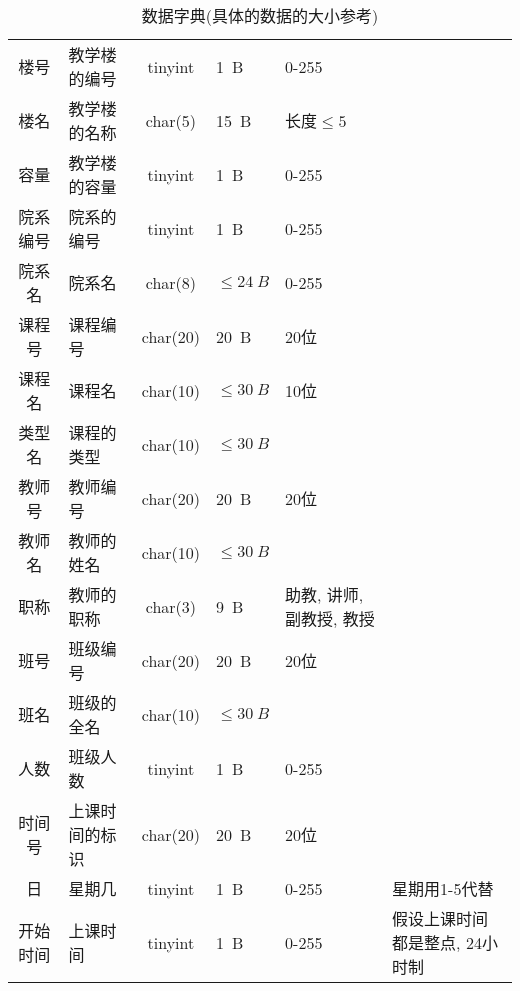 \documentclass{myreport}
\begin{document}
      \begin{longtabu} to \textwidth {clcXXX}
        \caption{数据字典(具体的数据的大小参考\cite{tinyint})}
        \label{t:data_dict} \\
        \toprule[1.5pt]
            &
           &
           &
           &
           &
           \\
        \midrule[1pt]
        \endhead

        \bottomrule[1.5pt]
        \endfoot


          楼号    & 教学楼的编号 & tinyint & \SI{1}{B} & 0-255 & \\
          楼名    & 教学楼的名称 & char(5) & \SI{15}{B} & 长度$\le 5$ & \\
          容量    & 教学楼的容量 & tinyint & \SI{1}{B} & 0-255 & \\
          院系编号 & 院系的编号 & tinyint & \SI{1}{B} & 0-255 & \\
          院系名   & 院系名 & char(8) & $\le\SI{24}{B}$ & 0-255 & \\
          课程号   & 课程编号 & char(20) & \SI{20}{B} & 20位 & \\
          课程名   & 课程名 & char(10) & $\le \SI{30}{B}$ & 10位 & \\
          类型名   & 课程的类型 & char(10) & $\le \SI{30}{B}$ & \\
          教师号   & 教师编号 & char(20) & \SI{20}{B} & 20位 & \\
          教师名   & 教师的姓名 & char(10) & $\le \SI{30}{B}$ & \\
          职称     & 教师的职称 & char(3) &\SI{9}{B}  & 助教, 讲师, 副教授, 教授 \\
          班号     & 班级编号 & char(20) & \SI{20}{B} & 20位 & \\
          班名     & 班级的全名 & char(10) & $\le \SI{30}{B}$ & \\
          人数     & 班级人数 & tinyint & \SI{1}{B} & 0-255 & \\
          时间号   & 上课时间的标识 & char(20) & \SI{20}{B} & 20位 & \\
          日       & 星期几 & tinyint & \SI{1}{B} & 0-255 & 星期用1-5代替\\
          开始时间 & 上课时间 & tinyint & \SI{1}{B} & 0-255 & 假设上课时间都是整点, 24小时制\\

\end{longtabu}
\end{document}
